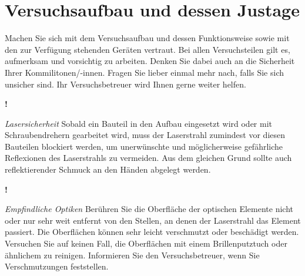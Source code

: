 



\section{Versuchsaufbau und dessen Justage}

Machen Sie sich mit dem Versuchsaufbau und dessen Funktionsweise sowie mit den zur Verfügung stehenden Geräten vertraut. Bei allen Versuchsteilen gilt es, aufmerksam und vorsichtig zu arbeiten. Denken Sie dabei auch an die Sicherheit Ihrer Kommilitonen/-innen. Fragen Sie lieber einmal mehr nach, falls Sie sich unsicher sind. Ihr Versuchsbetreuer wird Ihnen gerne weiter helfen. 

\begin{marginfigure}[10mm]{\Huge \textbf{!}}\end{marginfigure}%
\emph{Lasersicherheit} Sobald ein Bauteil in den Aufbau eingesetzt wird oder mit Schraubendrehern gearbeitet wird, muss der Laserstrahl zumindest vor diesen Bauteilen blockiert werden, um unerwünschte und möglicherweise gefährliche Reflexionen des Laserstrahls zu vermeiden.  Aus dem gleichen Grund sollte auch reflektierender Schmuck an den Händen abgelegt werden.

\begin{marginfigure}[10mm]{\Huge \textbf{!}}\end{marginfigure}%
\emph{Empfindliche Optiken} Berühren Sie die Oberfläche der optischen Elemente nicht oder nur sehr weit entfernt von den Stellen, an denen der Laserstrahl das Element passiert. Die Oberflächen können sehr leicht verschmutzt oder beschädigt werden. Versuchen Sie auf keinen Fall, die Oberflächen mit einem Brillenputztuch oder ähnlichem zu reinigen. Informieren Sie den Versuchsbetreuer, wenn Sie Verschmutzungen feststellen.  

